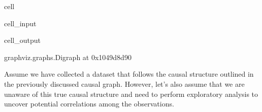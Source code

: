\documentclass[letterpaper,10pt,english]{jupyterBook}
\begin{document}
\begin{sphinxuseclass}{cell}\begin{sphinxVerbatimInput}

\begin{sphinxuseclass}{cell_input}
\begin{sphinxVerbatim}[commandchars=\\\{\}]
 
   

  

 
 
 

 
 

\end{sphinxVerbatim}

\end{sphinxuseclass}\end{sphinxVerbatimInput}
\begin{sphinxVerbatimOutput}

\begin{sphinxuseclass}{cell_output}
\begin{sphinxVerbatim}[commandchars=\\\{\}]
\PYGZlt{}graphviz.graphs.Digraph at 0x1049d8d90\PYGZgt{}
\end{sphinxVerbatim}

\end{sphinxuseclass}\end{sphinxVerbatimOutput}

\end{sphinxuseclass}
\sphinxAtStartPar
Assume we have collected a dataset that follows the causal structure outlined in the previously discussed causal graph. However, let’s also assume that we are unaware of this true causal structure and need to perform exploratory analysis to uncover potential correlations among the observations.
\end{document}
